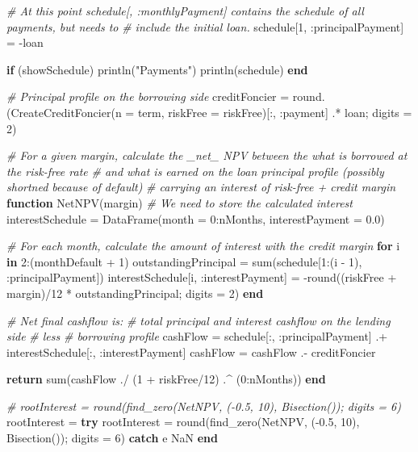 \documentclass[11pt,]{report}
\newenvironment{Shaded}{\begin{snugshade}}{\end{snugshade}}
\newcommand{\CommentTok}[1]{\textcolor[rgb]{0.56,0.35,0.01}{\textit{#1}}}
\newcommand{\FloatTok}[1]{\textcolor[rgb]{0.00,0.00,0.81}{#1}}
\newcommand{\KeywordTok}[1]{\textcolor[rgb]{0.13,0.29,0.53}{\textbf{#1}}}
\newcommand{\NormalTok}[1]{#1}
\newcommand{\StringTok}[1]{\textcolor[rgb]{0.31,0.60,0.02}{#1}}
\begin{document}
\begin{Shaded}
\begin{Highlighting}[numbers=left,,]
{{  \CommentTok{# At this point schedule[, :monthlyPayment] contains the schedule of all payments, but needs to}
  \CommentTok{# include the initial loan.}
\NormalTok{  schedule[}\FloatTok{1}\NormalTok{, :principalPayment] = -loan}

  \KeywordTok{if}\NormalTok{ (showSchedule)}
\NormalTok{    println(}\StringTok{"Payments"}\NormalTok{)}
\NormalTok{    println(schedule)}
  \KeywordTok{end}

  \CommentTok{# Principal profile on the borrowing side}
\NormalTok{  creditFoncier = round.(CreateCreditFoncier(n = term, riskFree = riskFree)[:, :payment] .* loan;}
\NormalTok{                                             digits = }\FloatTok{2}\NormalTok{)}

  \CommentTok{# For a given margin, calculate the _net_ NPV between the what is borrowed at the risk-free rate}
  \CommentTok{# and what is earned on the loan principal profile (possibly shortned because of default)}
  \CommentTok{# carrying an interest of risk-free + credit margin}
  \KeywordTok{function}\NormalTok{ NetNPV(margin)}
    \CommentTok{# We need to store the calculated interest}
\NormalTok{    interestSchedule = DataFrame(month = }\FloatTok{0}\NormalTok{:nMonths, interestPayment = }\FloatTok{0.0}\NormalTok{)}

    \CommentTok{# For each month, calculate the amount of interest with the credit margin}
    \KeywordTok{for}\NormalTok{ i }\KeywordTok{in} \FloatTok{2}\NormalTok{:(monthDefault + }\FloatTok{1}\NormalTok{)}
\NormalTok{      outstandingPrincipal = sum(schedule[}\FloatTok{1}\NormalTok{:(i - }\FloatTok{1}\NormalTok{), :principalPayment])}
\NormalTok{      interestSchedule[i, :interestPayment] =}
\NormalTok{            -round((riskFree + margin)/}\FloatTok{12}\NormalTok{ * outstandingPrincipal; digits = }\FloatTok{2}\NormalTok{)}
    \KeywordTok{end}

    \CommentTok{# Net final cashflow is:}
    \CommentTok{#     total principal and interest cashflow on the lending side}
    \CommentTok{# less}
    \CommentTok{#     borrowing profile}
\NormalTok{    cashFlow = schedule[:, :principalPayment] .+ interestSchedule[:, :interestPayment]}
\NormalTok{    cashFlow = cashFlow .- creditFoncier}

    \KeywordTok{return}\NormalTok{ sum(cashFlow ./ (}\FloatTok{1}\NormalTok{ + riskFree/}\FloatTok{12}\NormalTok{) .^ (}\FloatTok{0}\NormalTok{:nMonths))}
  \KeywordTok{end}

  \CommentTok{# rootInterest = round(find_zero(NetNPV, (-0.5, 10), Bisection()); digits = 6)}
\NormalTok{  rootInterest = }\KeywordTok{try}
\NormalTok{                   rootInterest = round(find_zero(NetNPV, (-}\FloatTok{0.5}\NormalTok{, }\FloatTok{10}\NormalTok{), Bisection()); digits = }\FloatTok{6}\NormalTok{)}
                 \KeywordTok{catch}\NormalTok{ e}
\NormalTok{                   NaN}
                 \KeywordTok{end}


}}
\end{Highlighting}
\end{Shaded}
\end{document}
